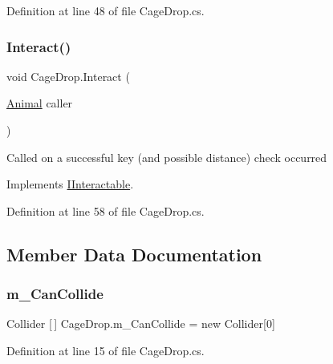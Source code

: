 Definition at line 48 of file Cage\+Drop.\+cs.

\mbox{\label{class_cage_drop_a5832f1672e4475be50319fa8e23f5cbc}} 
\subsubsection{\texorpdfstring{Interact()}{Interact()}}
{\footnotesize\ttfamily void Cage\+Drop.\+Interact (\begin{DoxyParamCaption}\item[{\mbox{\hyperlink{class_animal}{Animal}}}]{caller }\end{DoxyParamCaption})}



Called on a successful key (and possible distance) check occurred



Implements \mbox{\hyperlink{interface_i_interactable_ae38fb77e97bc1066db045b32db647681}{I\+Interactable}}.



Definition at line 58 of file Cage\+Drop.\+cs.



\subsection{Member Data Documentation}
\mbox{\label{class_cage_drop_a4a078e929ab43f3ceed60383dcb6a02c}} 
\subsubsection{\texorpdfstring{m\+\_\+\+Can\+Collide}{m\_CanCollide}}
{\footnotesize\ttfamily Collider \mbox{[}$\,$\mbox{]} Cage\+Drop.\+m\+\_\+\+Can\+Collide = new Collider\mbox{[}0\mbox{]}}



Definition at line 15 of file Cage\+Drop.\+cs.

\mbox{\label{class_cage_drop_ada79b293aef9836e982707e48d6fb0b2}} 
